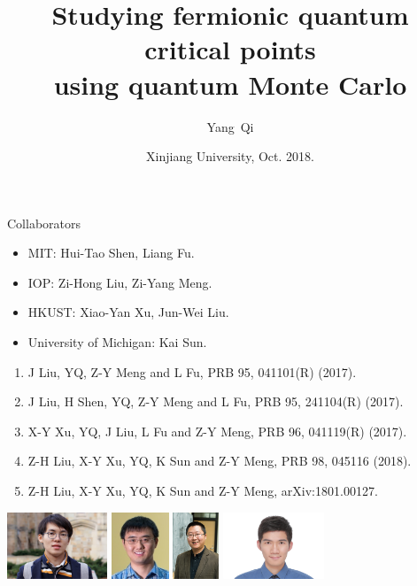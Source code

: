 \documentclass[xcolor=table, 10pt, aspectratio=43]{beamer}
\title[SMLC] %
{Studying fermionic quantum critical points\\ using quantum Monte Carlo}
\author[Y Qi] %
{Yang~Qi}
\institute[Fudan] %
{Department of Physics, Fudan University}
\date{Xinjiang University, Oct. 2018.}
\begin{document}
\begin{frame}
  \titlepage
\end{frame}

\begin{frame}{Collaborators}
\begin{itemize}
\item MIT: Hui-Tao Shen, Liang Fu.
\item IOP: Zi-Hong Liu, Zi-Yang Meng.
\item HKUST: Xiao-Yan Xu, Jun-Wei Liu.
\item University of Michigan: Kai Sun.
\end{itemize}
{\small
\begin{enumerate}
  \item J Liu, YQ, Z-Y Meng and L Fu, PRB 95, 041101(R) (2017).
  \item J Liu, H Shen, YQ, Z-Y Meng and L Fu, PRB 95, 241104(R) (2017).
  \item X-Y Xu, YQ, J Liu, L Fu and Z-Y Meng, PRB 96, 041119(R) (2017).
	\item Z-H Liu, X-Y Xu, YQ, K Sun and Z-Y Meng, PRB 98, 045116 (2018).
	\item Z-H Liu, X-Y Xu, YQ, K Sun and Z-Y Meng, arXiv:1801.00127.
\end{enumerate}}
\begin{center}
	\includegraphics[height=2cm]{../people/huitaoshen}
	\includegraphics[height=2cm]{../people/junweiliu}
	\includegraphics[height=2cm]{../people/liangfu}
	\includegraphics[height=2cm]{../people/xiaoyanxu}\\

\end{center}
\end{frame}
\end{document}
